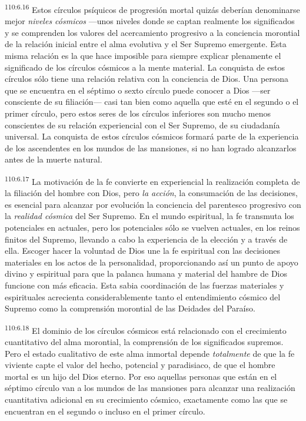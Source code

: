 \par
\textsuperscript{110:6.16} Estos círculos psíquicos de progresión mortal quizás deberían denominarse mejor \textit{niveles cósmicos} ---unos niveles donde se captan realmente los significados y se comprenden los valores del acercamiento progresivo a la conciencia morontial de la relación inicial entre el alma evolutiva y el Ser Supremo emergente. Esta misma relación es la que hace imposible para siempre explicar plenamente el significado de los círculos cósmicos a la mente material. La conquista de estos círculos sólo tiene una relación relativa con la conciencia de Dios. Una persona que se encuentra en el séptimo o sexto círculo puede conocer a Dios ---ser consciente de su filiación--- casi tan bien como aquella que esté en el segundo o el primer círculo, pero estos seres de los círculos inferiores son mucho menos conscientes de su relación experiencial con el Ser Supremo, de su ciudadanía universal. La conquista de estos círculos cósmicos formará parte de la experiencia de los ascendentes en los mundos de las mansiones, si no han logrado alcanzarlos antes de la muerte natural.

\par
\textsuperscript{110:6.17} La motivación de la fe convierte en experiencial la realización completa de la filiación del hombre con Dios, pero \textit{la acción}, la consumación de las decisiones, es esencial para alcanzar por evolución la conciencia del parentesco progresivo con la \textit{realidad cósmica} del Ser Supremo. En el mundo espiritual, la fe transmuta los potenciales en actuales, pero los potenciales sólo se vuelven actuales, en los reinos finitos del Supremo, llevando a cabo la experiencia de la elección y a través de ella. Escoger hacer la voluntad de Dios une la fe espiritual con las decisiones materiales en los actos de la personalidad, proporcionando así un punto de apoyo divino y espiritual para que la palanca humana y material del hambre de Dios funcione con más eficacia. Esta sabia coordinación de las fuerzas materiales y espirituales acrecienta considerablemente tanto el entendimiento cósmico del Supremo como la comprensión morontial de las Deidades del Paraíso.

\par
\textsuperscript{110:6.18} El dominio de los círculos cósmicos está relacionado con el crecimiento cuantitativo del alma morontial, la comprensión de los significados supremos. Pero el estado cualitativo de este alma inmortal depende \textit{totalmente} de que la fe viviente capte el valor del hecho, potencial y paradisiaco, de que el hombre mortal es un hijo del Dios eterno. Por eso aquellas personas que están en el séptimo círculo van a los mundos de las mansiones para alcanzar una realización cuantitativa adicional en su crecimiento cósmico, exactamente como las que se encuentran en el segundo o incluso en el primer círculo.

